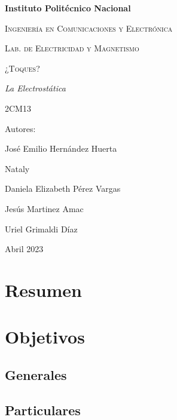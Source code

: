 \documentclass[14pt]{article}
\begin{document}
	\lhead{}
	\begin{titlepage}
		\begin{figure}[t]
			\hspace{0.6\textwidth}
		\end{figure}
		\centering
		{\bfseries\Huge Instituto Politécnico Nacional \par}
		\vspace{1cm}
		{\scshape\Large Ingeniería en Comunicaciones y Electrónica \par}
		\vspace{0.3cm}
		{\scshape\Large Lab. de Electricidad y Magnetismo  \par}
		\vspace{1cm}
		{\scshape\Huge ¿Toques? \par}
		\vspace{1cm}
		{\itshape\Large La Electrostática\par}
		{\Large 2CM13\par}
		\vfill
		{\Large Autores: \par}
		{\Large José Emilio Hernández Huerta \par}
		{\Large Nataly \par}
		{\Large Daniela Elizabeth Pérez Vargas \par}
		{\Large Jesús Martinez Amac\par}
		{\Large Uriel Grimaldi Díaz  \par}
		\vfill
		{\Large Abril 2023 \par}
	\end{titlepage}
	 \tableofcontents
	 
	\newpage
	\section{Resumen}
	\section{Objetivos} 
	\subsection{Generales}
	\subsection{Particulares}
\end{document}
